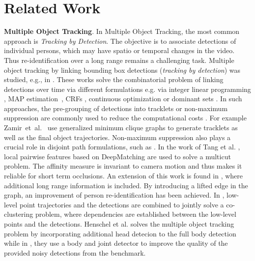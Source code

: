 
\section{Related Work}
\label{sec:related}
\noindent\textbf{Multiple Object Tracking}. 
In Multiple Object Tracking, the most common approach is \textit{Tracking by Detection}. 
The objective is to associate detections of individual persons, which may have spatio or temporal changes in the video. 
Thus re-identification over a long range remains a challenging task.
Multiple object tracking by linking bounding box detections (\emph{tracking by detection}) was studied, e.g., in \cite{Pirsiavash:2011:GOG,Andriyenko2012CVPR,Huang:2008:ROT,AndrilukaCVPR2010,FragkiadakiECCV12,Zamir:2012:GMC,Henschel:2014:EMP,tang14ijcv,Henschel:2014:EMP,DBLP:journals/corr/HenschelLCR17}. 
These works solve the combinatorial problem of linking detections over time via different formulations e.g. via integer linear programming \cite{Shitrit:2011:TMP,wang-et-al-2014}, MAP estimation~\cite{Pirsiavash:2011:GOG}, CRFs \cite{10.1007/978-3-319-16817-3_29}, continuous optimization \cite{Andriyenko2012CVPR} or dominant sets \cite{7503631}. 
In such approaches, the pre-grouping of detections into tracklets or non-maximum suppression are commonly used to reduce the computational costs \cite{Huang:2008:ROT,WojekECCV10,AndrilukaCVPR2010,FragkiadakiECCV12,Zamir:2012:GMC,WojekPAMI2013,Henschel:2014:EMP,tang14ijcv}.
For example Zamir~et~al.~\cite{Zamir:2012:GMC} use generalized minimum clique graphs to generate tracklets as well as the final object trajectories.
Non-maximum suppression also plays a crucial role in disjoint path formulations, such as \cite{networkflow1,networkflow2,Chari2015OnPC}.
In the work of Tang et al. \cite{tang2016multi}, local pairwise features based on DeepMatching are used to solve a multicut problem. 
The affinity measure is invariant to camera motion and thus makes it reliable for short term occlusions. 
An extension of this work is found in \cite{tang2017multiple}, where additional long range information is included. 
By introducing a lifted edge in the graph, an improvement of person re-identification has been achieved.
In \cite{keuper2018motion}, low-level point trajectories and the detections are combined to jointly solve a co-clustering problem, where dependencies are established between the low-level points and the detections. 
Henschel et al. \cite{henschel2018fusion} solves the multiple object tracking problem by incorporating additional head detecion to the full body detection while in \cite{henschel2019multiple}, they use a body and joint detector to improve the quality of the provided noisy detections from the benchmark.
